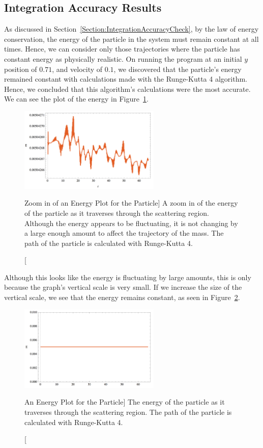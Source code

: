 \documentclass[12pt]{article} %
\begin{document}

\subsection{Integration Accuracy Results}
As discussed in Section~\ref{Section:IntegrationAccuracyCheck}, by the law of energy conservation, the energy of the particle in the system  must remain constant at all times. Hence, we can consider only those trajectories where the particle has constant energy as physically realistic. On running the program at an initial $y$ position of $0.71$, and velocity of $0.1$, we discovered that the particle's energy remained constant with calculations made with the Runge-Kutta 4 algorithm. Hence, we concluded that this algorithm's calculations were the most accurate. We can see the plot of the energy in Figure~\ref{fig:EnergyZoom}.

\begin{figure}[h]
	\centering
	\includegraphics[width=0.6\textwidth]{Ezoom}
	\caption
	[Zoom in of an Energy Plot for the Particle]
	{A zoom in of the energy of the particle as it traverses through the scattering region. Although the energy appears to be fluctuating, it is not changing by a large enough amount to affect the trajectory of the mass. The path of the particle is calculated with Runge-Kutta 4.}
	\label{fig:EnergyZoom}
\end{figure}

Although this looks like the energy is fluctuating by large amounts, this is only because the graph's vertical scale is very small. If we increase the size of the vertical scale, we see that the energy remains constant, as seen in Figure~\ref{fig:Energy}.

\begin{figure}[h]
	\centering
	\includegraphics[width=0.6\textwidth]{E}
	\caption
	[An Energy Plot for the Particle]
	{The energy of the particle as it traverses through the scattering region. The path of the particle is calculated with Runge-Kutta 4.}
	\label{fig:Energy}
\end{figure}
\end{document}

